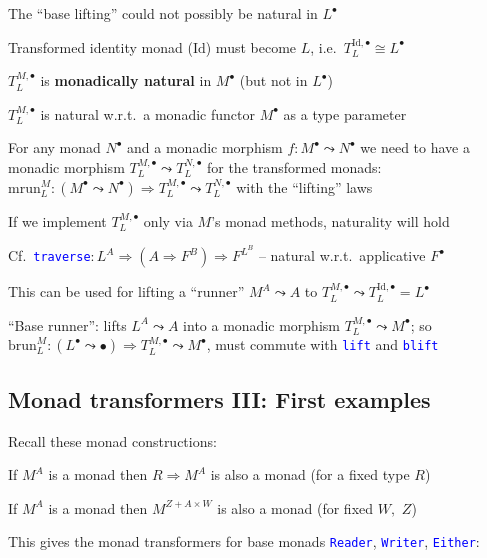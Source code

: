 The ``base lifting'' could not possibly be natural in $L^{\bullet}$

Transformed identity monad ($\text{Id}$) must become $L$, i.e.~$T_{L}^{\text{Id},\bullet}\cong L^{\bullet}$

$T_{L}^{M,\bullet}$ is \textbf{monadically natural} in $M^{\bullet}$
(but not in $L^{\bullet}$)

$T_{L}^{M,\bullet}$ is natural w.r.t.~a monadic functor $M^{\bullet}$
as a type parameter

For any monad $N^{\bullet}$ and a monadic morphism $f:M^{\bullet}\leadsto N^{\bullet}$
we need to have a monadic morphism $T_{L}^{M,\bullet}\leadsto T_{L}^{N,\bullet}$
for the transformed monads: $\text{mrun}_{L}^{M}:\left(M^{\bullet}\leadsto N^{\bullet}\right)\Rightarrow T_{L}^{M,\bullet}\leadsto T_{L}^{N,\bullet}$
with the ``lifting'' laws

If we implement $T_{L}^{M,\bullet}$ only via $M$'s monad methods,
naturality will hold 

Cf.~\texttt{\textcolor{blue}{\footnotesize{}traverse}}{\small{}$:L^{A}\Rightarrow(A\Rightarrow F^{B})\Rightarrow F^{L^{B}}$
– natural w.r.t.~applicative $F^{\bullet}$}{\small\par}

This can be used for lifting a ``runner'' $M^{A}\leadsto A$ to
$T_{L}^{M,\bullet}\leadsto T_{L}^{\text{Id},\bullet}=L^{\bullet}$

``Base runner'': lifts $L^{A}\leadsto A$ into a monadic morphism
$T_{L}^{M,\bullet}\leadsto M^{\bullet}$; so $\text{brun}_{L}^{M}:\left(L^{\bullet}\leadsto\bullet\right)\Rightarrow T_{L}^{M,\bullet}\leadsto M^{\bullet}$,
must commute with \texttt{\textcolor{blue}{\footnotesize{}lift}} and
\texttt{\textcolor{blue}{\footnotesize{}blift}} 


\subsection{Monad transformers III: First examples}

{\footnotesize{}\vspace{-0.15cm}}Recall these monad constructions:

If $M^{A}$ is a monad then $R\Rightarrow M^{A}$ is also a monad
(for a fixed type $R$)

If $M^{A}$ is a monad then $M^{Z+A\times W}$ is also a monad (for
fixed $W,$ $Z$)

This gives the monad transformers for base monads \texttt{\textcolor{blue}{\footnotesize{}Reader}},
\texttt{\textcolor{blue}{\footnotesize{}Writer}}, \texttt{\textcolor{blue}{\footnotesize{}Either}}:

